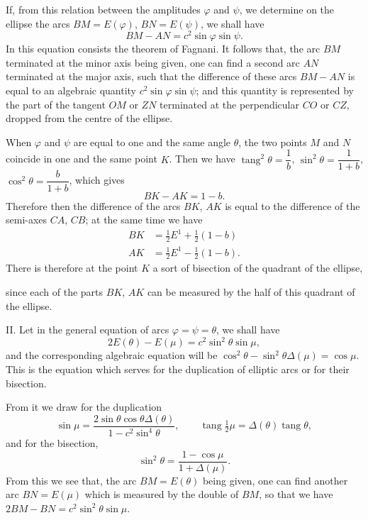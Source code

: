 \documentclass{article}
\begin{document}
If, from this relation between the amplitudes $\varphi$ and $\psi$, we determine on the ellipse the arcs $BM=E(\varphi)$, $BN=E(\psi)$, we shall have
\[ BM-AN=c^{2}\sin\varphi\sin\psi. \]
In this equation consists the theorem of Fagnani. It follows that, the arc $BM$ terminated at the minor axis being given, one can find a second arc $AN$ terminated at the major axis, such that the difference of these arcs $BM-AN$ is equal to an algebraic quantity $c^{2}\sin\varphi\sin\psi$; and this quantity is represented by the part of the tangent $OM$ or $ZN$ terminated at the perpendicular $CO$ or $CZ$, dropped from the centre of the ellipse.

When $\varphi$ and $\psi$ are equal to one and the same angle $\theta$, the two points $M$ and $N$ coincide in one and the same point $K$. Then we have $\operatorname{tang}^{2}\theta=\dfrac{1}{b}$, $\sin^{2}\theta=\dfrac{1}{1+b}$, $\cos^{2}\theta=\dfrac{b}{1+b}$, which gives
\[ BK-AK=1-b. \]
Therefore then the difference of the arcs $BK$, $AK$ is equal to the difference of the semi-axes $CA$, $CB$; at the same time we have
\[ \begin{aligned} BK &= \tfrac{1}{2}E^{1}+\tfrac{1}{2}(1-b) \\ AK &= \tfrac{1}{2}E^{1}-\tfrac{1}{2}(1-b). \end{aligned} \]
There is therefore at the point $K$ a sort of bisection of the quadrant of the ellipse,

since each of the parts $BK$, $AK$ can be measured by the half of this quadrant of the ellipse.

II. Let in the general equation of arcs $\varphi=\psi=\theta$, we shall have
\[ 2E(\theta)-E(\mu)=c^{2}\sin^{2}\theta\sin\mu, \]
and the corresponding algebraic equation will be $\cos^{2}\theta-\sin^{2}\theta\Delta(\mu)=\cos\mu$. This is the equation which serves for the duplication of elliptic arcs or for their bisection.

From it we draw for the duplication
\[ \sin\mu=\frac{2\sin\theta\cos\theta\Delta(\theta)}{1-c^{2}\sin^{4}\theta},\qquad \operatorname{tang}\tfrac{1}{2}\mu=\Delta(\theta)\operatorname{tang}\theta, \]
and for the bisection,
\[ \sin^{2}\theta=\frac{1-\cos\mu}{1+\Delta(\mu)}. \]
From this we see that, the arc $BM=E(\theta)$ being given, one can find another arc $BN=E(\mu)$ which is measured by the double of $BM$, so that we have $2BM-BN=c^{2}\sin^{2}\theta\sin\mu$.

\end{document}
